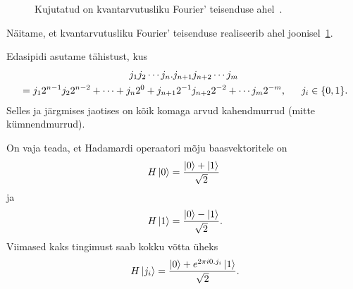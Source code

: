 \documentclass[12pt]{report}
\def\ket#1{\mathinner{|#1\rangle}}
\begin{document}
\begin{figure}
    \centering
    \ifdefined\yquanton
    \fi
    \caption{Kujutatud on kvantarvutusliku Fourier' teisenduse ahel~\cite{nielsen+chuang, kaye+laflamme+mosca}.}
    \label{fig:qft}
\end{figure}

Näitame, et kvantarvutusliku Fourier' teisenduse realiseerib ahel joonisel~\ref{fig:qft}.

Edasipidi asutame tähistust, kus
\begin{multline}
    j_1j_2\cdots j_n.j_{n+1}j_{n+2}\cdots j_m \\
    = j_1 2^{n-1} j_2 2^{n-2} + \cdots + j_n 2^0 + j_{n+1} 2^{-1} j_{n+2} 2^{-2} + \cdots j_m 2^{-m} \rlap{,}
    \qquad j_i \in \{0, 1\} \rlap{.}
\end{multline}
Selles ja järgmises jaotises on kõik komaga arvud kahendmurrud (mitte kümnendmurrud).

On vaja teada, et Hadamardi operaatori mõju baasvektoritele on
\begin{align}
    H\ket{0} = \frac{\ket{0} + \ket{1}}{\sqrt{2}}
\end{align}
ja
\begin{align}
    H\ket{1} = \frac{\ket{0} - \ket{1}}{\sqrt{2}} \rlap{.}
\end{align}
Viimased kaks tingimust saab kokku võtta üheks
\begin{align}
    H\ket{j_i} = \frac{\ket{0} + e^{2\pi i0.j_i}\ket{1}}{\sqrt{2}}\rlap{.}
\end{align}
\end{document}
